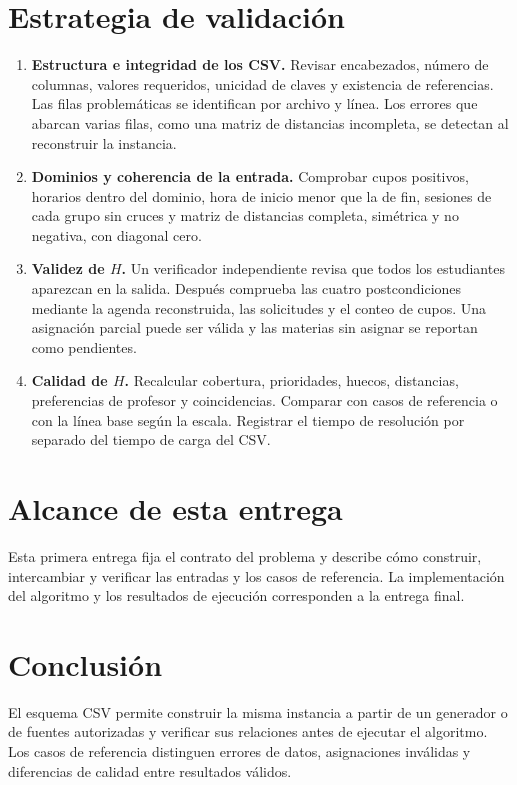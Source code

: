\documentclass[11pt]{article}
\numberwithin{equation}{section}
\numberwithin{figure}{section}
\numberwithin{table}{section}
\theoremstyle{definition}
\begin{document}
\section{Estrategia de validación}

\begin{enumerate}
  \item \textbf{Estructura e integridad de los CSV.} Revisar encabezados,
        número de columnas, valores requeridos, unicidad de claves y
        existencia de referencias. Las filas problemáticas se identifican
        por archivo y línea. Los errores que abarcan varias filas, como una
        matriz de distancias incompleta, se detectan al reconstruir la
        instancia.
  \item \textbf{Dominios y coherencia de la entrada.} Comprobar cupos
        positivos, horarios dentro del dominio, hora de inicio menor que
        la de fin, sesiones de cada grupo sin cruces y matriz de distancias
        completa, simétrica y no negativa, con diagonal cero.
  \item \textbf{Validez de $H$.} Un verificador independiente revisa que
        todos los estudiantes aparezcan en la salida. Después comprueba
        las cuatro postcondiciones mediante la agenda reconstruida,
        las solicitudes y el conteo de cupos. Una asignación parcial puede
        ser válida y las materias sin asignar se reportan como pendientes.
  \item \textbf{Calidad de $H$.} Recalcular cobertura, prioridades, huecos,
        distancias, preferencias de profesor y coincidencias. Comparar
        con casos de referencia o con la línea base según la escala.
        Registrar el tiempo de resolución por separado del tiempo de carga
        del CSV.
\end{enumerate}

\section{Alcance de esta entrega}

Esta primera entrega fija el contrato del problema y describe cómo construir,
intercambiar y verificar las entradas y los casos de referencia. La
implementación del algoritmo y los resultados de ejecución corresponden a
la entrega final.

\section{Conclusión}

El esquema CSV permite construir la misma instancia a partir de un generador
o de fuentes autorizadas y verificar sus relaciones antes de ejecutar el
algoritmo. Los casos de referencia distinguen errores de datos, asignaciones
inválidas y diferencias de calidad entre resultados válidos.
\end{document}
